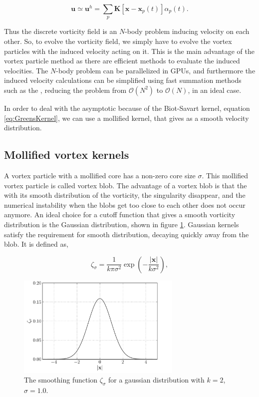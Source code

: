 	\begin{equation}
	\mathbf{u} \simeq \mathbf{u}^h = \sum_p \mathbf{K}\left[\mathbf{x}-\mathbf{x}_p\left(t\right)\right]\alpha_p\left(t\right).
	\label{eq:discreteVelocity}
	\end{equation}
	
Thus the discrete vorticity field is an $N$-body problem inducing velocity on each other. So, to evolve the vorticity field, we simply have to evolve the vortex particles with the induced velocity acting on it. This is the main advantage of the vortex particle method as there are efficient methods to evaluate the induced velocities. The $N$-body problem can be parallelized in GPUs, and furthermore the induced velocity calculations can be simplified using fast summation methods such as the , reducing the problem from $\mathcal{O}(N^2)$ to $\mathcal{O}(N)$, in an ideal case.

In order to deal with the asymptotic because of the Biot-Savart kernel, equation \ref{eq:GreensKernel}, we can use a mollified kernel, that gives as a smooth velocity distribution.

\subsection{Mollified vortex kernels}

A vortex particle with a mollified core has a non-zero core size $\sigma$. This mollified vortex particle is called vortex blob. The advantage of a vortex blob is that the with its smooth distribution of the vorticity, the singularity disappear, and the numerical instability when the blobs get too close to each other does not occur anymore. An ideal choice for a cutoff function that gives a smooth vorticity distribution is the Gaussian distribution, shown in figure \ref{fig:gaussianDistribution}. Gaussian kernels satisfy the requirement for smooth distribution, decaying quickly away from the blob. It is defined as,
	
	\begin{equation}
	\zeta_{\sigma} = \frac{1}{k\pi\sigma^2}\exp\left(-\frac{\left|\mathbf{x}\right|}{k\sigma^2}\right),
	\end{equation}
	
	\begin{figure}[t]
	\centering
	\includegraphics[width=0.7\textwidth]{figures/lagrangian/gaussianKernel.pdf}
	\caption{The smoothing function $\zeta_{\sigma}$ for a gaussian distribution with $k=2$, $\sigma=1.0$.}
	\label{fig:gaussianDistribution}
	\end{figure}

